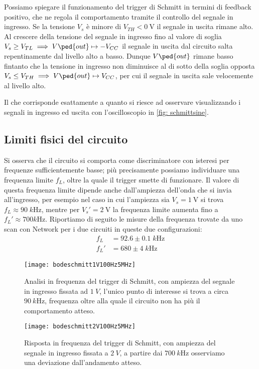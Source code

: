 \documentclass[10pt, a4paper, italian]{article}
\begin{document}
Possiamo spiegare il funzionamento del trigger di Schmitt in termini di
feedback positivo, che ne regola il comportamento tramite il controllo del
segnale in ingresso. Se la tensione $V_s$ è minore di $V_{TH} < \SI{0}{\V}$
il segnale in uscita rimane alto. Al crescere della tensione del segnale
in ingresso fino al valore di soglia
$V_s \geq V_{TL} \implies V\ped{out} \mapsto -V_{CC}$ il segnale in uscita
dal circuito salta repentinamente dal livello alto a basso. Dunque
$V\ped{out}$ rimane basso fintanto che la tensione in ingresso non diminuisce
al di sotto della soglia opposta
$V_s \leq V_{TH} \implies V\ped{out} \mapsto V_{CC}$, per cui il segnale in
uscita sale velocemente al livello alto.

Il che corrisponde esattamente a quanto si riesce ad osservare visualizzando
i segnali in ingresso ed uscita con l'oscilloscopio in \cref{fig: schmittsine}.

\subsection{Limiti fisici del circuito}\label{sub: trglim}
Si osserva che il circuito si comporta come discriminatore con isteresi per
frequenze sufficientemente basse; più precisamente possiamo individuare una
frequenza limite $f_L$, oltre la quale il trigger smette di funzionare.
Il valore di questa frequenza limite dipende anche dall'ampiezza dell'onda che
si invia all'ingresso, per esempio nel caso in cui l'ampiezza sia
$V_s = \SI{1}{\V}$ si trova $f_L \approx 90 \; \si{k\Hz}$, mentre per
$V_s' = \SI{2}{\V}$ la frequenza limite aumenta fino a
$f_L' \approx 700 \si{k\Hz}$. Riportiamo di seguito le misure della frequenza
trovate da uno scan con Network per i due circuiti in queste due
configurazioni:
\begin{align*}
f_L &= 92.6 \pm 0.1 \; \si{k\Hz} \\
f_L' &= 680 \pm 4 \; \si{k\Hz}
\end{align*}

\begin{figure}[htbp]
	\centering
	\texttt{[image: bodeschmitt1V100Hz5MHz]}
	\caption{Analisi in frequenza del trigger di Schmitt, con ampiezza del segnale
	in ingresso fissata ad $\SI{1}{V}$, l'unico punto di interesse si trova a
	circa $\SI{90}{k\Hz}$, frequenza oltre alla quale il circuito non ha più
	il comportamento atteso.}
\end{figure}

\begin{figure}[htbp]
	\centering
	\texttt{[image: bodeschmitt2V100Hz5MHz]}
	\caption{Risposta in frequenza del trigger di Schmitt, con ampiezza del
	segnale in ingresso fissata a $\SI{2}{V}$, a partire dai $\SI{700}{k\Hz}$
	osserviamo una deviazione dall'andamento atteso.}
\end{figure}
\end{document}
